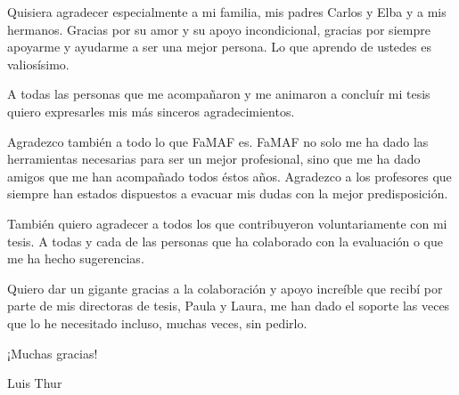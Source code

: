 \documentclass[
11pt, %
oneside, %
english, %
doublespacing, %
nolistspacing, %
parskip, %
parident,
headsepline, %
]{MastersDoctoralThesis} %
\begin{document}

\renewcommand{\contentsname}{Contenido}
\tableofcontents %


\begin{acknowledgements}

Quisiera agradecer especialmente a mi familia, mis padres Carlos y Elba y a mis hermanos. Gracias por su amor y su apoyo incondicional, gracias por siempre apoyarme y ayudarme a ser una mejor persona. Lo que aprendo de ustedes es valiosísimo.

A todas las personas que me acompañaron y me animaron a concluír mi tesis quiero expresarles mis más sinceros agradecimientos.

Agradezco también a todo lo que FaMAF es. FaMAF no solo me ha dado las herramientas necesarias para ser un mejor profesional, sino que me ha dado amigos que me han acompañado todos éstos años. Agradezco a los profesores que siempre han estados dispuestos a evacuar mis dudas con la mejor predisposición.

 También quiero agradecer a todos los que contribuyeron voluntariamente con mi tesis. A todas y cada de las personas que ha colaborado con la evaluación o que me ha hecho sugerencias.

Quiero dar un gigante gracias a la colaboración y apoyo increíble que recibí por parte de mis directoras de tesis, Paula y Laura, me han dado el soporte las veces que lo he necesitado incluso, muchas veces, sin pedirlo.

\hfill ¡Muchas gracias!

\hfill Luis Thur

\end{acknowledgements}


\end{document}
